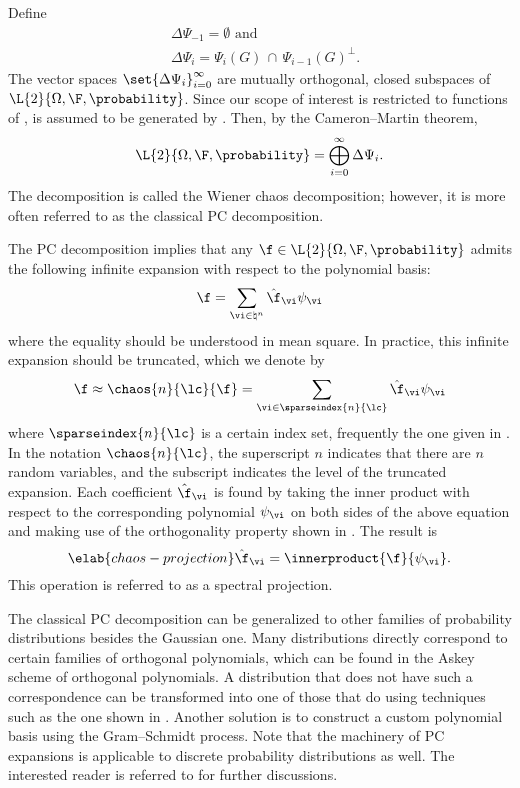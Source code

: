 Define
\begin{align*}
  & \Delta\Psi_{-1} = \emptyset \text{ and} \\
  & \Delta\Psi_i = \Psi_i(G) \, \cap \, \Psi_{i - 1}(G)^\perp.
\end{align*}
The vector spaces $\set{\Delta\Psi_i}_{i = 0}^\infty$ are mutually orthogonal,
closed subspaces of $\L{2}{\Omega, \F, \probability}$. Since our scope of
interest is restricted to functions of \vx, \F is assumed to be generated by
\vx. Then, by the Cameron--Martin theorem,
\[
  \L{2}{\Omega, \F, \probability} = \bigoplus_{i = 0}^\infty \Delta\Psi_i.
\]
The decomposition is called the Wiener chaos decomposition; however, it is more
often referred to as the classical \ac{PC} decomposition.

The \ac{PC} decomposition implies that any $\f \in \L{2}{\Omega, \F,
\probability}$ admits the following infinite expansion with respect to the
polynomial basis:
\[
  \f = \sum_{\vi \in \natural^n} \hat{\f}_{\vi} \psi_{\vi}
\]
where the equality should be understood in mean square. In practice, this
infinite expansion should be truncated, which we denote by
\[
  \f \approx \chaos{n}{\lc}{\f} = \sum_{\vi \in \sparseindex{n}{\lc}} \hat{\f}_{\vi} \psi_{\vi}
\]
where $\sparseindex{n}{\lc}$ is a certain index set, frequently the one given in
. In the notation $\chaos{n}{\lc}$, the
superscript $n$ indicates that there are $n$ random variables, and the subscript
\lc indicates the level of the truncated expansion. Each coefficient
$\hat{\f}_{\vi}$ is found by taking the inner product with respect to the
corresponding polynomial $\psi_{\vi}$ on both sides of the above equation and
making use of the orthogonality property shown in .
The result is
\begin{equation} \elab{chaos-projection}
  \hat{\f}_{\vi} = \innerproduct{\f}{\psi_{\vi}}.
\end{equation}
This operation is referred to as a spectral projection.

The classical \ac{PC} decomposition can be generalized to other families of
probability distributions besides the Gaussian one. Many distributions directly
correspond to certain families of orthogonal polynomials, which can be found in
the Askey scheme of orthogonal polynomials. A distribution that does not have
such a correspondence can be transformed into one of those that do using
techniques such as the one shown in . Another
solution is to construct a custom polynomial basis using the Gram--Schmidt
process. Note that the machinery of \ac{PC} expansions is applicable to discrete
probability distributions as well. The interested reader is referred to
\cite{xiu2010} for further discussions.
